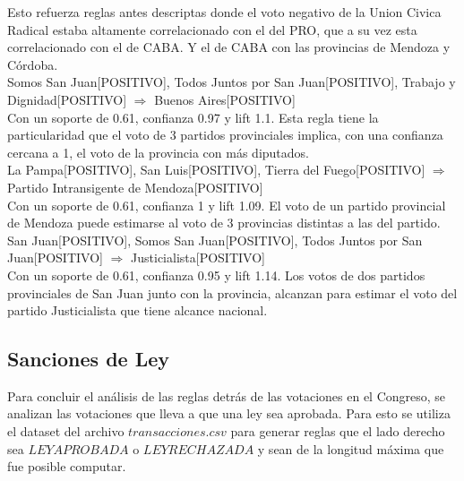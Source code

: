 \documentclass{endm}
\begin{document}
Esto refuerza reglas antes descriptas donde el voto negativo de la Union Civica Radical estaba altamente correlacionado con el del PRO, que a su vez esta correlacionado con el de CABA. Y el de CABA con las provincias de Mendoza y Córdoba.\\

{Somos San Juan[POSITIVO],                      Todos Juntos por San Juan[POSITIVO],            Trabajo y Dignidad[POSITIVO]}   $\Longrightarrow$ {Buenos Aires[POSITIVO]} \\

Con un soporte de 0.61, confianza 0.97 y lift 1.1. Esta regla tiene la particularidad que el voto de 3 partidos provinciales implica, con una confianza cercana a 1, el voto de la provincia con más diputados. \\

{La Pampa[POSITIVO],                            San Luis[POSITIVO],                             Tierra del Fuego[POSITIVO]}  $\Longrightarrow$ {Partido Intransigente de Mendoza[POSITIVO]} \\

Con un soporte de 0.61, confianza 1 y lift 1.09. El voto de un partido provincial de Mendoza puede estimarse al voto de 3 provincias distintas a las del partido.\\


{San Juan[POSITIVO],                            Somos San Juan[POSITIVO],                       Todos Juntos por San Juan[POSITIVO]}    $\Longrightarrow$ {Justicialista[POSITIVO]}  \\

Con un soporte de 0.61, confianza 0.95 y lift 1.14. Los votos de dos partidos provinciales de San Juan junto con la provincia, alcanzan para estimar el voto del partido Justicialista que tiene alcance nacional. \\

\subsection{Sanciones de Ley}

Para concluir el análisis de las reglas detrás de las votaciones en el Congreso, se analizan las votaciones que lleva a que una ley sea aprobada. Para esto se utiliza el dataset del archivo $transacciones.csv$ para generar reglas que el lado derecho sea $LEYAPROBADA$ o $LEYRECHAZADA$ y sean de la longitud máxima que fue posible computar. \\
\end{document}
